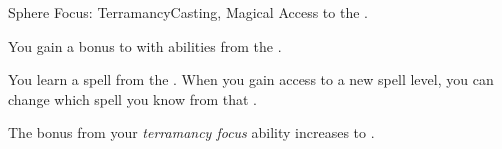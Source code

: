     \begin{feat}{Sphere Focus: Terramancy}{Casting, Magical}
        \featpre Access to the  .

         You gain a  bonus to  with abilities from the  .

         You learn a spell from the  .
        When you gain access to a new spell level, you can change which spell you know from that .

         The bonus from your \textit{terramancy focus} ability increases to .
    \end{feat}

